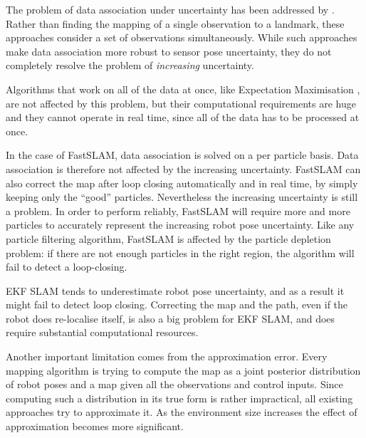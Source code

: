 The problem of data association under uncertainty has been addressed
by \cite{neira01:_data_assoc_stoch_mappin_using,
  tardos02:_mappin_local_indoor_envir_using_sonar_data}.  Rather than
finding the mapping of a single observation to a landmark, these
approaches consider a set of observations simultaneously. While such
approaches make data association more robust to sensor pose
uncertainty, they do not completely resolve the problem of {\it
  increasing} uncertainty.


Algorithms that work on all of the data at once, like Expectation
Maximisation \cite{thrun98:_probab}, are not affected by this problem,
but their computational requirements are huge and they cannot operate
in real time, since all of the data has to be processed at once.

In the case of FastSLAM, data association is solved on a per particle
basis. Data association is therefore not affected by the increasing
uncertainty. FastSLAM can also correct the map after loop closing
automatically and in real time, by simply keeping only the ``good''
particles. Nevertheless the increasing uncertainty is still a
problem. In order to perform reliably, FastSLAM will require more and
more particles to accurately represent the increasing robot pose
uncertainty. Like any particle filtering algorithm, FastSLAM is
affected by the particle depletion problem: if there are not enough
particles in the right region, the algorithm will fail to detect a
loop-closing.

EKF SLAM tends to underestimate robot pose uncertainty, and as a
result it might fail to detect loop closing. Correcting the map and
the path, even if the robot does re-localise itself, is also a big
problem for EKF SLAM, and does require substantial computational
resources.

Another important limitation comes from the approximation error. Every
mapping algorithm is trying to compute the map as a joint posterior
distribution of robot poses and a map given all the observations and
control inputs. Since computing such a distribution in its true form
is rather impractical, all existing approaches try to approximate it.
As the environment size increases the effect of approximation becomes
more significant.



